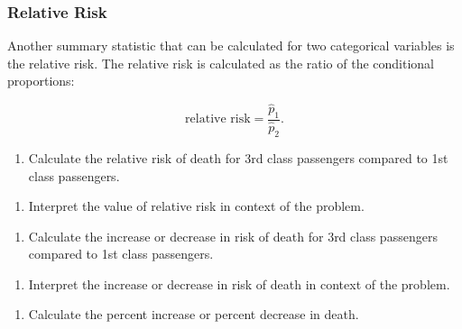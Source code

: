 \documentclass[
]{report}
\providecommand{\tightlist}{%
  \setlength{\itemsep}{0pt}\setlength{\parskip}{0pt}}
\begin{document}
\vspace{0.8in}

\hypertarget{relative-risk-1}{%
\subsubsection*{Relative Risk}\label{relative-risk-1}}

Another summary statistic that can be calculated for two categorical variables is the relative risk. The relative risk is calculated as the ratio of the conditional proportions:

\[\text{relative risk} = \frac{\hat{p}_1}{\hat{p}_2}.\]

\begin{enumerate}
\def\labelenumi{\arabic{enumi}.}
\setcounter{enumi}{5}
\tightlist
\item
  Calculate the relative risk of death for 3rd class passengers compared to 1st class passengers.
\end{enumerate}

\vspace{0.7in}

\begin{enumerate}
\def\labelenumi{\arabic{enumi}.}
\setcounter{enumi}{6}
\tightlist
\item
  Interpret the value of relative risk in context of the problem.
\end{enumerate}

\vspace{0.7in}

\begin{enumerate}
\def\labelenumi{\arabic{enumi}.}
\setcounter{enumi}{7}
\tightlist
\item
  Calculate the increase or decrease in risk of death for 3rd class passengers compared to 1st class passengers.
\end{enumerate}

\vspace{0.5in}

\begin{enumerate}
\def\labelenumi{\arabic{enumi}.}
\setcounter{enumi}{8}
\tightlist
\item
  Interpret the increase or decrease in risk of death in context of the problem.
\end{enumerate}

\vspace{0.8in}

\begin{enumerate}
\def\labelenumi{\arabic{enumi}.}
\setcounter{enumi}{9}
\tightlist
\item
  Calculate the percent increase or percent decrease in death.
\end{enumerate}
\end{document}
